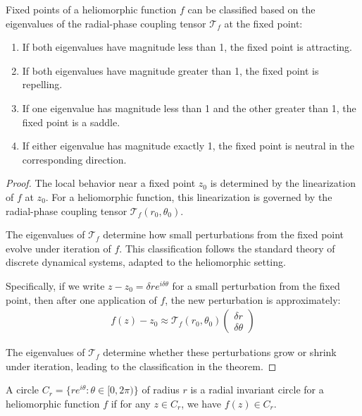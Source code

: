 \begin{definition}
\begin{enumerate}
\begin{definition}
\begin{definition}
\begin{theorem}
Fixed points of a heliomorphic function $f$ can be classified based on the eigenvalues of the radial-phase coupling tensor $\mathcal{T}_f$ at the fixed point:
\begin{enumerate}
    \item If both eigenvalues have magnitude less than 1, the fixed point is attracting.
    \item If both eigenvalues have magnitude greater than 1, the fixed point is repelling.
    \item If one eigenvalue has magnitude less than 1 and the other greater than 1, the fixed point is a saddle.
    \item If either eigenvalue has magnitude exactly 1, the fixed point is neutral in the corresponding direction.
\end{enumerate}
\end{theorem}

\begin{proof}
The local behavior near a fixed point $z_0$ is determined by the linearization of $f$ at $z_0$. For a heliomorphic function, this linearization is governed by the radial-phase coupling tensor $\mathcal{T}_f(r_0,\theta_0)$.

The eigenvalues of $\mathcal{T}_f$ determine how small perturbations from the fixed point evolve under iteration of $f$. This classification follows the standard theory of discrete dynamical systems, adapted to the heliomorphic setting.

Specifically, if we write $z - z_0 = \delta r e^{i \delta \theta}$ for a small perturbation from the fixed point, then after one application of $f$, the new perturbation is approximately:
\begin{align}
f(z) - z_0 \approx \mathcal{T}_f(r_0,\theta_0) \begin{pmatrix} \delta r \\ \delta \theta \end{pmatrix}
\end{align}

The eigenvalues of $\mathcal{T}_f$ determine whether these perturbations grow or shrink under iteration, leading to the classification in the theorem.
\end{proof}

\begin{definition}
A circle $C_r = \{re^{i\theta} : \theta \in [0, 2\pi)\}$ of radius $r$ is a radial invariant circle for a heliomorphic function $f$ if for any $z \in C_r$, we have $f(z) \in C_r$.
\end{definition}


\end{definition}
\end{definition}
\end{enumerate}
\end{definition}
